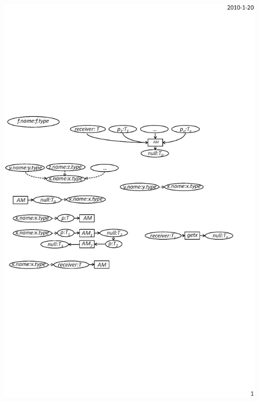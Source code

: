 \begin{enumerate}
\begin{center}
\includegraphics[scale=0.7,clip]{figure/rule8.eps}%
\end{center}\vspace*{-3.5ex}


\end{enumerate}
